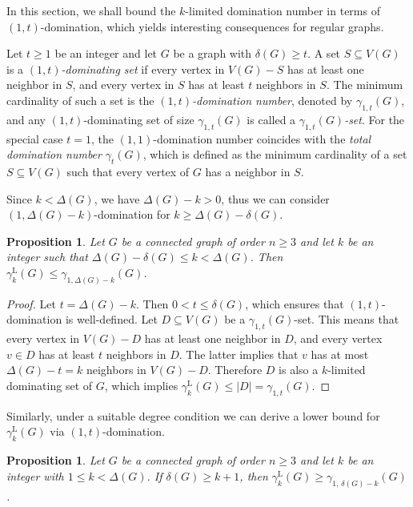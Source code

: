 \documentclass[11pt]{article}
\newtheorem{proposition}[theorem]{Proposition}
\newcommand{\gammakL}{\gamma_k^{\mathrm L}}
\begin{document}
In this section, we shall bound the $k$-limited domination number in terms of $(1,t)$-domination, which yields interesting consequences for regular graphs.

Let $t \ge 1$ be an integer and let $G$ be a graph with $\delta(G) \ge t$.  
A set $S \subseteq V(G)$ is a \emph{$(1,t)$-dominating set} if every vertex in $V(G)- S$ has at least one neighbor in $S$, and every vertex in $S$ has at least $t$ neighbors in $S$. The minimum cardinality of such a set is the \emph{$(1,t)$-domination number}, denoted by $\gamma_{1,t}(G)$, and any $(1,t)$-dominating set of size $\gamma_{1,t}(G)$ is called a \emph{$\gamma_{1,t}(G)$-set}. For the special case $t=1$, the $(1,1)$-domination number coincides with the \emph{total domination number} $\gamma_t(G)$, which is defined as the minimum cardinality of a set $S \subseteq V(G)$ such that every vertex of $G$ has a neighbor in $S$.


\medskip
Since $k<\Delta(G)$, we have $\Delta(G)-k>0$, thus we can consider $(1,\Delta(G)-k)$-domination for $k\geq \Delta(G)-\delta(G)$.

\begin{proposition}
\label{zgornja-1t}
Let $G$ be a connected graph of order $n\geq 3$ and let $k$ be an integer such that $\Delta(G)-\delta(G)\leq k < \Delta(G)$.
Then $\gammakL(G)\leq \gamma_{1,\Delta(G)-k}(G)$.
\end{proposition}

\begin{proof}
Let $t=\Delta(G)-k$. Then $0<t\leq \delta(G)$, which ensures that $(1,t)$-domination 
is well-defined.  
Let $D \subseteq V(G)$ be a $\gamma_{1,t}(G)$-set. This means that every vertex in $V(G)-D$ has at least one neighbor in $D$, and every vertex $v\in D$ has at least $t$ neighbors in $D$. The latter implies that $v$ has at most $\Delta(G)-t=k$ neighbors in $V(G)-D$. Therefore $D$ is also a $k$-limited dominating set of $G$, which implies $\gammakL(G)\leq|D|=\gamma_{1,t}(G)$.
\end{proof}

Similarly, under a suitable degree condition we can derive a lower bound for $\gammakL(G)$ via $(1,t)$-domination.


\begin{proposition}
\label{spodnja-1t}
Let $G$ be a connected graph of order $n\geq 3$ and let $k$ be an integer with $1 \le k < \Delta(G)$. 
If $\delta(G) \ge k+1$, then
$\gammakL(G) \geq 
\gamma_{1,\,\delta(G)-k}(G)$.
\end{proposition}
\end{document}
